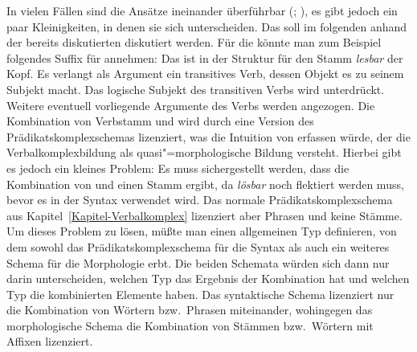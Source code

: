 In vielen Fällen sind die Ansätze ineinander überführbar (\citealp[--169]{Koenig99a}; \citealp[Kapitel~6.2.5.2]{Mueller2002b}),
es gibt jedoch ein paar Kleinigkeiten, in denen sie sich unterscheiden. Das soll im folgenden
anhand der bereits diskutierten \bard diskutiert werden.
Für die \bard könnte man zum Beispiel folgendes Suffix für  annehmen:
\eas
{}%
\zs
Das \bars ist in der Struktur für den Stamm \emph{lesbar} der Kopf. Es verlangt als Argument ein transitives
Verb, dessen Objekt  es zu seinem Subjekt macht. Das logische Subjekt des transitiven Verbs wird unterdrückt.
Weitere eventuell vorliegende Argumente des Verbs  werden angezogen.
Die Kombination von Verbstamm und  wird durch eine Version des Prädikatskomplexschemas lizenziert,
was die Intuition von \citet{Bierwisch90a} erfassen würde, der die Verbalkomplexbildung als quasi"=morphologische
Bildung versteht. Hierbei gibt es jedoch ein kleines Problem: Es muss sichergestellt werden, dass die Kombination
von  und  einen Stamm ergibt, da \emph{lösbar} noch flektiert werden muss, bevor es in
der Syntax verwendet wird. Das normale Prädikatskomplexschema aus Kapitel~\ref{Kapitel-Verbalkomplex} lizenziert
aber Phrasen und keine Stämme. Um dieses Problem zu lösen, müßte man einen allgemeinen Typ definieren,
von dem sowohl das Prädikatskomplexschema für die Syntax als auch ein weiteres Schema für die Morphologie erbt.
Die beiden Schemata würden sich dann nur darin unterscheiden, welchen Typ das Ergebnis der Kombination hat und
welchen Typ die kombinierten Elemente haben. Das syntaktische Schema lizenziert nur die Kombination von Wörtern
bzw.\ Phrasen miteinander, wohingegen das morphologische Schema die Kombination von Stämmen bzw.\ Wörtern mit
Affixen lizenziert.

